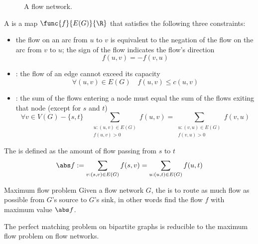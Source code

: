 \documentclass[a4paper, 12pt]{report}
\begin{document}
\begin{example}
\begin{figure}[H]
            \caption{A flow network.}
        \end{figure}
    \end{example}

    A  is a map $\func{f}{E(G)}{\R}$ that satisfies the following three constraints:

    \begin{itemize}
        \item {} the flow on an arc from $u$ to $v$ is equivalent to the negation of the flow on the arc from $v$ to $u$; the sign of the flow indicates the flow's direction $$f(u,v) = -f(v, u)$$
        \item {}: the flow of an edge cannot exceed its capacity $$\forall (u, v) \in E(G) \quad f(u, v) \le c(u, v)$$
        \item {}: the sum of the flows entering a node must equal the sum of the flows exiting that node (except for $s$ and $t$) $$\forall v \in V(G) - \{s, t\} \quad \sum_{\substack{u:(u, v) \in E(G) \\f(u, v) >0}}{f(u, v)} = \sum_{\substack{u:(v, u)\in E(G) \\ f(v, u) >0}}{f(v, u)}$$
    \end{itemize}

    The  is defined as the amount of flow passing from $s$ to $t$ $$\abs f := \sum_{v : (s, v) \in E(G)}{f(s, v)} = \sum_{u:(u, t)\in E(G)}{f(u, t)}$$

    \begin{frameddefn}{Maximum flow problem}
        Given a flow network $G$, the  is to route as much flow as possible from $G$'s source to $G$'s sink, in other words find the flow $f$ with maximum value $\abs f$.
    \end{frameddefn}

    \begin{framedthm}{}
        The perfect matching problem on bipartite graphs is reducible to the maximum flow problem on flow networks.
    \end{framedthm}
\end{document}
